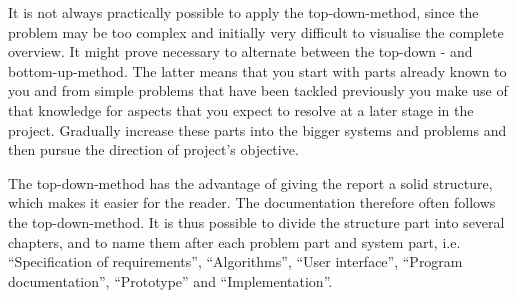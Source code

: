 It is not always practically possible to apply the top-down-method, since the problem may be too complex and initially very difficult to visualise the complete overview. It might prove necessary to alternate between the top-down - and bottom-up-method. The latter means that you start with parts already known to you and from simple problems that have been tackled previously you  make use of that knowledge for aspects that you expect to resolve at a later stage in the project. Gradually increase these parts into the bigger systems and problems and then pursue the direction of project's objective.

The top-down-method has the advantage of giving the report a solid structure, which makes it easier for the reader. The documentation therefore often follows the top-down-method. It is thus possible to divide the structure part into several chapters, and to name them after each problem part and system part, i.e. “Specification of requirements”, “Algorithms”, “User interface”, “Program documentation”, “Prototype” and “Implementation”.
\fi
